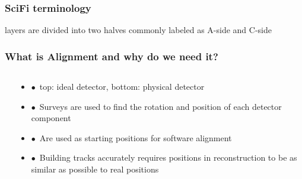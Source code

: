 \documentclass[aspectratio=1610, 12pt, xcolor=dvipsnames]{beamer}
\begin{document}
\begin{frame}\frametitle{SciFi terminology}
layers are divided into two halves commonly labeled as A-side and C-side
  
\end{frame}

\begin{frame}\frametitle{What is Alignment and why do we need it?}
  \begin{columns}
    \begin{column}[c]{0.48\textwidth}
      
    \end{column}
    \begin{column}[c]{0.48\textwidth}
      \begin{itemize}
        \item $\bullet$\, top: ideal detector, bottom: physical detector
        \item $\bullet$\, Surveys are used to find the rotation and position of each detector component
        \item $\bullet$\, Are used as starting positions for software alignment
        \item $\bullet$\, Building tracks accurately requires positions in reconstruction to be as similar as possible to real positions
      \end{itemize}
    \end{column}
  \end{columns}
\end{frame}
\end{document}
